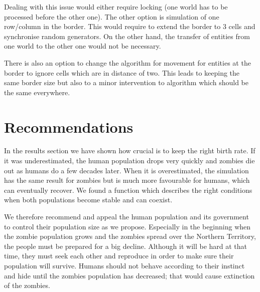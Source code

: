 \documentclass[a4paper]{article}
\begin{document}
Dealing with this issue would either require locking (one world has to be processed before the other one).
The other option is simulation of one row/column in the border.
This would require to extend the border to 3 cells and synchronise random generators.
On the other hand, the transfer of entities from one world to the other one would not be necessary.

There is also an option to change the algorithm for movement for entities at the border to ignore cells which are in distance of two.
This leads to keeping the same border size but also to a minor intervention to algorithm which should be the same everywhere.

\section{Recommendations}

In the results section we have shown how crucial is to keep the right birth rate.
If it was underestimated, the human population drops very quickly and zombies die out as humans do a few decades later.
When it is overestimated, the simulation has the same result for zombies but is much more favourable for humans, which can eventually recover.
We found a function which describes the right conditions when both populations become stable and can coexist.

We therefore recommend and appeal the human population and its government to control their population size as we propose.
Especially in the beginning when the zombie population grows and the zombies spread over the Northern Territory, the people must be prepared for a big decline.
Although it will be hard at that time, they must seek each other and reproduce in order to make sure their population will survive.
Humans should not behave according to their instinct and hide until the zombies population has decreased; that would cause extinction of the zombies.



\begingroup
\raggedright



\endgroup
\end{document}
